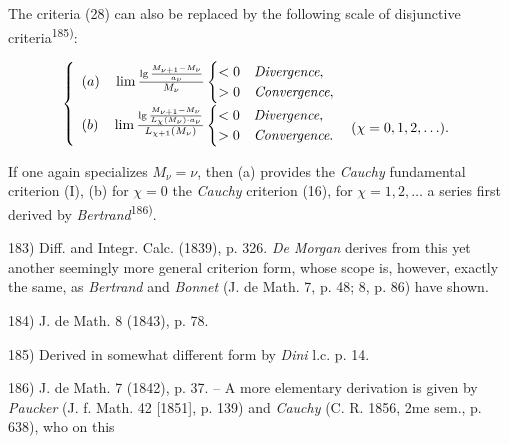 The criteria (28) can also be replaced by the following scale of disjunctive criteria\textsuperscript{185)}:

\vspace{-0.5cm}
\begin{align}
\left\{
\begin{array}{l}
(a) \quad \lim \frac{\lg \frac{M_{\nu+1} - M_\nu}{a_\nu}}{M_\nu} \begin{cases} < 0 & \textit{Divergence}, \\ > 0 & \textit{Convergence}, \end{cases} \\[1em]
(b) \quad \lim \frac{\lg \frac{M_{\nu+1} - M_\nu}{L_\chi(M_\nu) \cdot a_\nu}}{L_{\chi+1}(M_\nu)} \begin{cases} < 0 & \textit{Divergence}, \\ > 0 & \textit{Convergence}. \end{cases} \raisebox{-0.5ex}{$\quad (\chi = 0, 1, 2, \ldots).$}
\end{array}
\right.
\end{align}

If one again specializes $M_\nu = \nu$, then (a) provides the \textit{Cauchy} fundamental criterion (I), (b) for $\chi = 0$ the \textit{Cauchy} criterion (16), for $\chi = 1, 2, \ldots$ a series first derived by \textit{Bertrand}\textsuperscript{186)}.

\vfill
\leftline{\rule{2in}{0.4pt}}
\vspace{0.2cm}
{
\footnotesize
183) Diff. and Integr. Calc. (1839), p. 326. \textit{De Morgan} derives from this yet another seemingly more general criterion form, whose scope is, however, exactly the same, as \textit{Bertrand} and \textit{Bonnet} (J. de Math. 7, p. 48; 8, p. 86) have shown.

184) J. de Math. 8 (1843), p. 78.

185) Derived in somewhat different form by \textit{Dini} l.c. p. 14.

186) J. de Math. 7 (1842), p. 37. -- A more elementary derivation is given by \textit{Paucker} (J. f. Math. 42 [1851], p. 139) and \textit{Cauchy} (C. R. 1856, 2me sem., p. 638), who on this

}